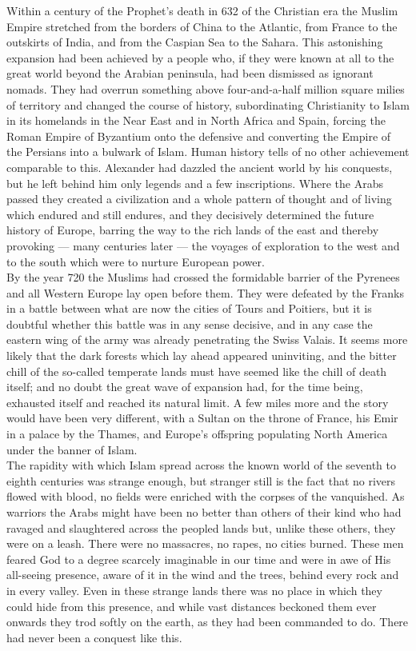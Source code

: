 \documentclass[11pt, b5paper, twoside]{book}
\begin{document}
Within a century of the Prophet's death in 632 of the Christian era the Muslim Empire stretched from the borders of China to the Atlantic, from France to the outskirts of India, and from the Caspian Sea to the Sahara. This astonishing expansion had been achieved by a people who, if they were known at all to the great world beyond the Arabian peninsula, had been dismissed as ignorant nomads. They had overrun something above four-and-a-half million square milies of territory and changed the course of history, subordinating Christianity to Islam in its homelands in the Near East and in North Africa and Spain, forcing the Roman Empire of Byzantium onto the defensive and converting the Empire of the Persians into a bulwark of Islam. Human history tells of no other achievement comparable to this. Alexander had dazzled the ancient world by his conquests, but he left behind him only legends and a few inscriptions. Where the Arabs passed they created a civilization and a whole pattern of thought and of living which endured and still endures, and they decisively determined the future history of Europe, barring the way to the rich lands of the east and thereby provoking --- many centuries later --- the voyages of exploration to the west and to the south which were to nurture European power. \\

By the year 720 the Muslims had crossed the formidable barrier of the Pyrenees and all Western Europe lay open before them. They were defeated by the Franks in a battle between what are now the cities of Tours and Poitiers, but it is doubtful whether this battle was in any sense decisive, and in any case the eastern wing of the army was already penetrating the Swiss Valais. It seems more likely that the dark forests which lay ahead appeared uninviting, and the bitter chill of the so-called temperate lands must have seemed like the chill of death itself; and no doubt the great wave of expansion had, for the time being, exhausted itself and reached its natural limit. A few miles more and the story would have been very different, with a Sultan on the throne of France, his Emir in a palace by the Thames, and Europe's offspring populating North America under the banner of Islam. \\

The rapidity with which Islam spread across the known world of the seventh to eighth centuries was strange enough, but stranger still is the fact that no rivers flowed with blood, no fields were enriched with the corpses of the vanquished. As warriors the Arabs might have been no better than others of their kind who had ravaged and slaughtered across the peopled lands but, unlike these others, they were on a leash. There were no massacres, no rapes, no cities burned. These men feared God to a degree scarcely imaginable in our time and were in awe of His all-seeing presence, aware of it in the wind and the trees, behind every rock and in every valley. Even in these strange lands there was no place in which they could hide from this presence, and while vast distances beckoned them ever onwards they trod softly on the earth, as they had been commanded to do. There had never been a conquest like this. \\
\end{document}
